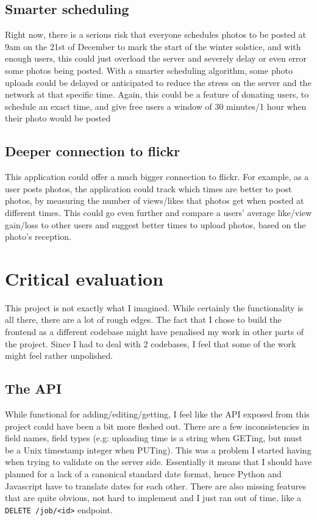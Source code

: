 \documentclass[10pt, a4paper]{article}
\begin{document}
        \subsection{Smarter scheduling}
        Right now, there is a serious risk that everyone schedules photos to be posted at 9am on the 21st of December to mark the start of the winter solstice, and with enough users, this could just overload the server and severely delay or even error some photos being posted. With a smarter scheduling algorithm, some photo uploads could be delayed or anticipated to reduce the stress on the server and the network at that specific time. Again, this could be a feature of donating users, to schedule an exact time, and give free users a window of 30 minutes/1 hour when their photo would be posted

        \subsection{Deeper connection to flickr}
        This application could offer a much bigger connection to flickr. For example, as a user posts photos, the application could track which times are better to post photos, by measuring the number of views/likes that photos get when posted at different times. This could go even further and compare a users' average like/view gain/loss to other users and suggest better times to upload photos, based on the photo's reception.

        \section{Critical evaluation}
        This project is not exactly what I imagined. While certainly the functionality is all there, there are a lot of rough edges. The fact that I chose to build the frontend as a different codebase might have penalised my work in other parts of the project. Since I had to deal with 2 codebases, I feel that some of the work might feel rather unpolished.
        
        \subsection{The API}
        While functional for adding/editing/getting, I feel like the API exposed from this project could have been a bit more fleshed out. There are a few inconsistencies in field names, field types (e.g: uploading time is a string when GETing, but must be a Unix timestamp integer when PUTing). This was a problem I started having when trying to validate on the server side. Essentially it means that I should have planned for a lack of a canonical standard date format, hence Python and Javascript have to translate dates for each other.
        There are also missing features that are quite obvious, not hard to implement and I just ran out of time, like a \texttt{DELETE /job/<id>} endpoint.
\end{document}
